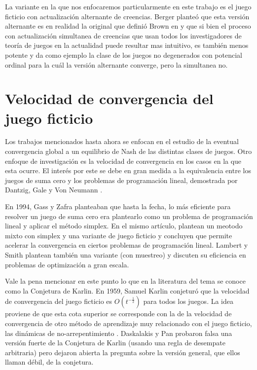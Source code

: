 La variante en la que nos enfocaremos particularmente en este trabajo es el juego ficticio con actualización alternante de creencias. Berger \cite{browns:original} planteó que esta versión alternante es en realidad la original que definió Brown en \cite{brown:1951} y que si bien el proceso con actualización simultanea de creencias que usan todos los investigadores de teoría de juegos en la actualidad puede resultar mas intuitivo, es también menos potente y da como ejemplo la clase de los juegos no degenerados con potencial ordinal para la cuál la versión alternante converge, pero la simultanea no.

\section{Velocidad de convergencia del juego ficticio}

Los trabajos mencionados hasta ahora se enfocan en el estudio de la eventual convergencia global a un equilibrio de Nash de las distintas clases de juegos. Otro enfoque de investigación es la velocidad de convergencia en los casos en la que esta ocurre. El interés por este se debe en gran medida a la equivalencia entre los juegos de suma cero y los problemas de programación lineal, demostrada por Dantzig, Gale y Von Neumann \cite{fplp:equiv} \cite{programming:game:equivalence}.

En 1994, Gass y Zafra \cite{modified:fp:linear} planteaban que hasta la fecha, lo más eficiente para resolver un juego de suma cero era plantearlo como un problema de programación lineal y aplicar el método simplex. En el mismo artículo, plantean un meotodo mixto con simplex y una variante de juego ficticio y concluyen que permite acelerar la convergencia en ciertos problemas de programación lineal. Lambert y Smith \cite{aproach:large:scale} plantean también una variante (con muestreo) y discuten su eficiencia en problemas de optimización a gran escala.

Vale la pena mencionar en este punto lo que en la literatura del tema se conoce como la Conjetura de Karlin. En 1959, Samuel Karlin \cite{karlin:conjecture} conjeturó que la velocidad de convergencia del juego ficticio es $O(t^{-\frac{1}{2}})$ para todos los juegos. La idea proviene de que esta cota superior se corresponde con la de la velocidad de convergencia de otro método de aprendizaje muy relacionado con el juego ficticio, las dinámicas de no-arrepentimiento \cite{no:regret} \cite{no:regret:2}. Daskalakis y Pan \cite{counter:karlin:strong} probaron falsa una versión fuerte de la Conjetura de Karlin (usando una regla de desempate arbitraria) pero dejaron abierta la pregunta sobre la versión general, que ellos llaman débil, de la conjetura.

